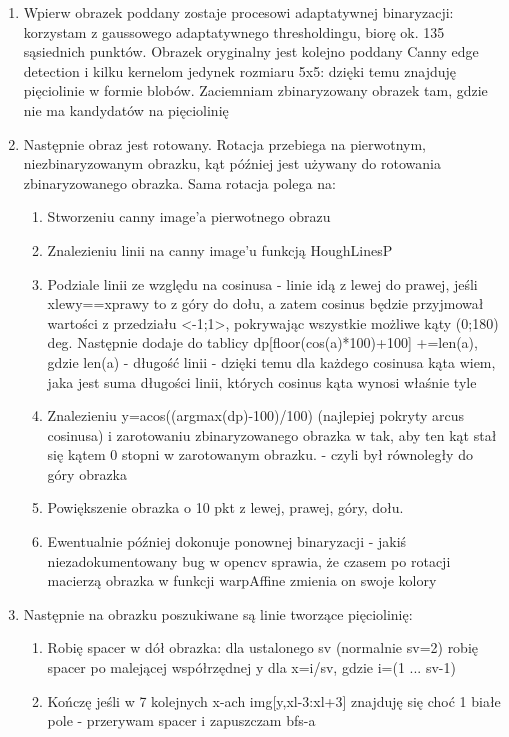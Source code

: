 \documentclass[12pt]{article}
\begin{document}
	\begin {enumerate}
		\item{Wpierw obrazek poddany zostaje procesowi adaptatywnej binaryzacji: korzystam z gaussowego adaptatywnego thresholdingu, biorę ok. 135 sąsiednich punktów. Obrazek oryginalny jest kolejno poddany 
		Canny edge detection i kilku kernelom jedynek rozmiaru 5x5: dzięki temu znajduję pięciolinie w formie blobów. Zaciemniam zbinaryzowany obrazek tam, gdzie nie ma kandydatów na pięciolinię}
		\item{Następnie obraz jest rotowany. Rotacja przebiega na pierwotnym, niezbinaryzowanym obrazku, kąt później jest używany do rotowania zbinaryzowanego obrazka. Sama rotacja polega na:}
		\begin {enumerate}
			\item{Stworzeniu canny image'a pierwotnego obrazu}
			\item{Znalezieniu linii na canny image'u funkcją HoughLinesP}
			\item{Podziale linii ze względu na cosinusa - linie idą z lewej do prawej, jeśli xlewy==xprawy to z góry do dołu, a zatem cosinus będzie przyjmował wartości z przedziału <-1;1>, pokrywając
			 wszystkie możliwe kąty (0;180) deg. Następnie dodaje do tablicy dp[floor(cos(a)*100)+100] +=len(a), gdzie len(a) - długość linii - dzięki temu dla każdego cosinusa kąta wiem, jaka jest suma długości 
			 linii, których cosinus kąta wynosi właśnie tyle}
			 \item{Znalezieniu y=acos((argmax(dp)-100)/100) (najlepiej pokryty arcus cosinusa) i zarotowaniu zbinaryzowanego obrazka w tak, aby ten kąt stał się kątem 0 stopni w zarotowanym obrazku. - 
			 czyli był równoległy do góry obrazka}
			 \item{Powiększenie obrazka o 10 pkt z lewej, prawej, góry, dołu.}
			 \item{Ewentualnie później dokonuje ponownej binaryzacji - jakiś niezadokumentowany bug w opencv sprawia, że czasem po rotacji macierzą obrazka w funkcji warpAffine zmienia on swoje kolory}
		\end {enumerate}
		\item{Następnie na obrazku poszukiwane są linie tworzące pięciolinię:}
		\begin {enumerate}
			\item{Robię spacer w dół obrazka: dla ustalonego sv (normalnie sv=2) robię spacer po malejącej współrzędnej y dla x=i/sv, gdzie i=(1 ... sv-1)}
			\item{Kończę jeśli w 7 kolejnych x-ach img[y,xl-3:xl+3] znajduję się choć 1 białe pole - przerywam spacer i zapuszczam bfs-a}

\end{enumerate}
\end{enumerate}
\end{document}
